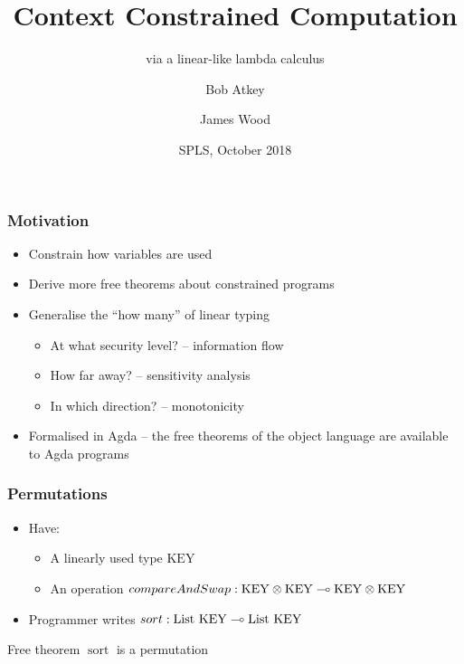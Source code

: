 \documentclass[fleqn]{beamer}
\title{Context Constrained Computation}
\subtitle{via a linear-like lambda calculus}
\author{Bob Atkey\inst{1} \and James Wood\inst{1}}
\institute{\inst{1}University of Strathclyde}
\date{SPLS, October 2018}
\begin{document}
  \setlength{\abovedisplayskip}{0pt}
  \frame{\titlepage}
  \begin{frame}
    \frametitle{Motivation}

    \begin{itemize}
    \item Constrain how variables are used \pause
    \item Derive more free theorems about constrained programs \pause
    \item Generalise the ``how many'' of linear typing \pause
      \begin{itemize}
      \item At what security level? -- information flow \pause
      \item How far away? -- sensitivity analysis \pause
      \item In which direction? -- monotonicity \pause
      \end{itemize}
    \item Formalised in Agda -- the free theorems of the object language are
      available to Agda programs
    \end{itemize}
  \end{frame}
  \begin{frame}
    \frametitle{Permutations}
    \newcommand{\KEY}{\mathrm{KEY}}
    \begin{itemize}
    \item Have: \pause
      \begin{itemize}
      \item A linearly used type $\KEY$ \pause
      \item An operation $\mathop{compareAndSwap} : \fun{\tensor{\KEY}{\KEY}}{\tensor{\KEY}{\KEY}}$ \pause
      \end{itemize}
    \item Programmer writes $\mathop{sort} : \fun{\mathrm{List}~\KEY}{\mathrm{List}~\KEY}$ \pause
    \end{itemize}
    \begin{block}{Free theorem}
      $\mathop{sort}$ is a permutation
    \end{block}
  \end{frame}
\end{document}
